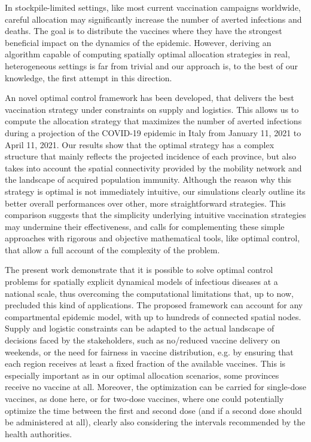 In stockpile-limited settings, like most current vaccination campaigns worldwide, careful allocation may significantly increase the number of averted infections and deaths. The goal is to distribute the vaccines where they have the strongest beneficial impact on the dynamics of the epidemic. However, deriving an algorithm capable of computing spatially optimal allocation strategies in real, heterogeneous settings is far from trivial and our approach is, to the best of our knowledge, the first attempt in this direction. 

An novel optimal control framework has been developed, that delivers the best vaccination strategy under constraints on supply and logistics. This allows us to compute the allocation strategy that maximizes the number of averted infections during a projection of the COVID-19 epidemic in Italy from January 11, 2021 to April 11, 2021. Our results show that the optimal strategy has a complex structure that mainly reflects the projected incidence of each province, but also takes into account the spatial connectivity provided by the mobility network and the landscape of acquired population immunity. Although the reason why this strategy is optimal is not immediately intuitive, our simulations clearly outline its better overall performances over other, more straightforward strategies. This comparison suggests that the simplicity underlying intuitive vaccination strategies may undermine their effectiveness, and calls for complementing these simple approaches with rigorous and objective mathematical tools, like optimal control, that allow a full account of the complexity of the problem.

The present work demonstrate that it is possible to solve optimal control problems for spatially explicit dynamical models of infectious diseases at a national scale, thus overcoming the computational limitations that, up to now, precluded this kind of applications. The proposed framework can account for any compartmental epidemic model, with up to hundreds of connected spatial nodes. Supply and logistic constraints can be adapted to the actual landscape of decisions faced by the stakeholders, such as no/reduced vaccine delivery on weekends, or the need for fairness in vaccine distribution, e.g. by ensuring that each region receives at least a fixed fraction of the available vaccines. This is especially important as in our optimal allocation scenarios, some provinces receive no vaccine at all. Moreover, the optimization can be carried for single-dose vaccines, as done here, or for two-dose vaccines, where one could potentially optimize the time between the first and second dose (and if a second dose should be administered at all), clearly also considering the intervals recommended by the health authorities.

